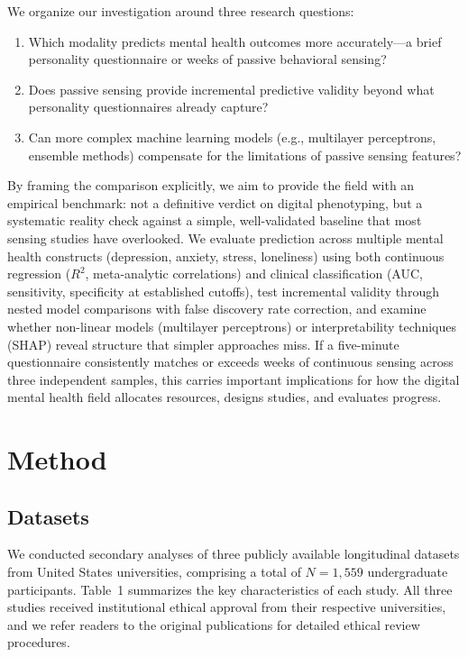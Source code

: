 \documentclass[12pt, a4paper]{article}
\begin{document}
We organize our investigation around three research questions:

\begin{enumerate}
    \item[\textbf{RQ1.}] Which modality predicts mental health outcomes more accurately---a brief personality questionnaire or weeks of passive behavioral sensing?
    \item[\textbf{RQ2.}] Does passive sensing provide incremental predictive validity beyond what personality questionnaires already capture?
    \item[\textbf{RQ3.}] Can more complex machine learning models (e.g., multilayer perceptrons, ensemble methods) compensate for the limitations of passive sensing features?
\end{enumerate}

By framing the comparison explicitly, we aim to provide the field with an empirical benchmark: not a definitive verdict on digital phenotyping, but a systematic reality check against a simple, well-validated baseline that most sensing studies have overlooked. We evaluate prediction across multiple mental health constructs (depression, anxiety, stress, loneliness) using both continuous regression ($R^2$, meta-analytic correlations) and clinical classification (AUC, sensitivity, specificity at established cutoffs), test incremental validity through nested model comparisons with false discovery rate correction, and examine whether non-linear models (multilayer perceptrons) or interpretability techniques (SHAP) reveal structure that simpler approaches miss. If a five-minute questionnaire consistently matches or exceeds weeks of continuous sensing across three independent samples, this carries important implications for how the digital mental health field allocates resources, designs studies, and evaluates progress.

\section{Method}

\subsection{Datasets}

We conducted secondary analyses of three publicly available longitudinal datasets from United States universities, comprising a total of $N = 1{,}559$ undergraduate participants. Table~1 summarizes the key characteristics of each study. All three studies received institutional ethical approval from their respective universities, and we refer readers to the original publications for detailed ethical review procedures.
\end{document}
